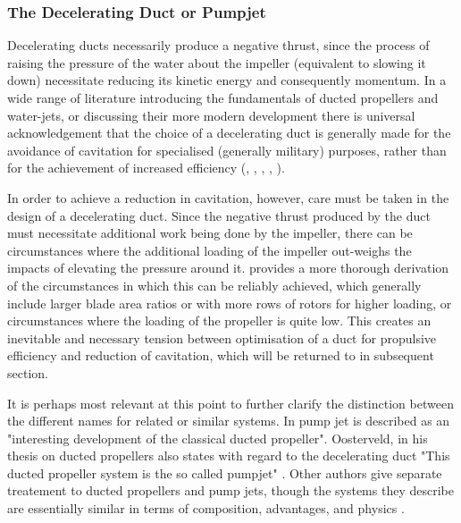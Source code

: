\documentclass{article}\usepackage[]{graphicx}\usepackage[]{color}
\begin{document}
\subsubsection{The Decelerating Duct or Pumpjet}
Decelerating ducts necessarily produce a negative thrust, since the process of raising the pressure of the water about the impeller (equivalent to slowing it down) necessitate reducing its kinetic energy and consequently momentum.  In a wide range of literature introducing the fundamentals of ducted propellers and water-jets, or discussing their more modern development there is universal acknowledgement that the choice of a decelerating duct is generally made for the avoidance of cavitation for specialised (generally military) purposes, rather than for the achievement of increased efficiency (\cite{carlton2007}, \cite{oosterveld1970}, \cite{mollard2011}, \cite{haimov2010}, \cite{lewis1988}).

In order to achieve a reduction in cavitation, however, care must be taken in the design of a decelerating duct.  Since the negative thrust produced by the duct must necessitate additional work being done by the impeller, there can be circumstances where the additional loading of the impeller out-weighs the impacts of elevating the pressure around it. \cite[24-25]{oosterveld1970} provides a more thorough derivation of the circumstances in which this can be reliably achieved, which generally include larger blade area ratios or with more rows of rotors for higher loading, or circumstances where the loading of the propeller is quite low.  This creates an inevitable and necessary tension between optimisation of a duct for propulsive efficiency and reduction of cavitation, which will be returned to in subsequent section.

It is perhaps most relevant at this point to further clarify the distinction between the different names for related or similar systems.  In \cite[17]{carlton2007} pump jet is described as an "interesting development of the classical ducted propeller". Oosterveld, in his thesis on ducted propellers also states with regard to the decelerating duct "This ducted propeller system is the so called pumpjet" \parencite[8]{oosterveld1970}.  Other authors give separate treatement to ducted propellers and pump jets, though the systems they describe are essentially similar in terms of composition, advantages, and physics \parencite[288]{lewis1988}.
\end{document}
